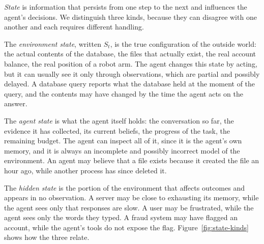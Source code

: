 \documentclass[11pt]{book}
\begin{document}
\emph{State} is information that persists from one step to the next and influences the agent's decisions. We distinguish three kinds, because they can disagree with one another and each requires different handling.

The \textit{environment state}, written $S_t$, is the true configuration of the outside world: the actual contents of the database, the files that actually exist, the real account balance, the real position of a robot arm. The agent changes this state by acting, but it can usually see it only through observations, which are partial and possibly delayed. A database query reports what the database held at the moment of the query, and the contents may have changed by the time the agent acts on the answer.

The \textit{agent state} is what the agent itself holds: the conversation so far, the evidence it has collected, its current beliefs, the progress of the task, the remaining budget. The agent can inspect all of it, since it is the agent's own memory, and it is always an incomplete and possibly incorrect model of the environment. An agent may believe that a file exists because it created the file an hour ago, while another process has since deleted it.

The \textit{hidden state} is the portion of the environment that affects outcomes and appears in no observation. A server may be close to exhausting its memory, while the agent sees only that responses are slow. A user may be frustrated, while the agent sees only the words they typed. A fraud system may have flagged an account, while the agent's tools do not expose the flag. Figure~\ref{fig:state-kinds} shows how the three relate.
\end{document}
